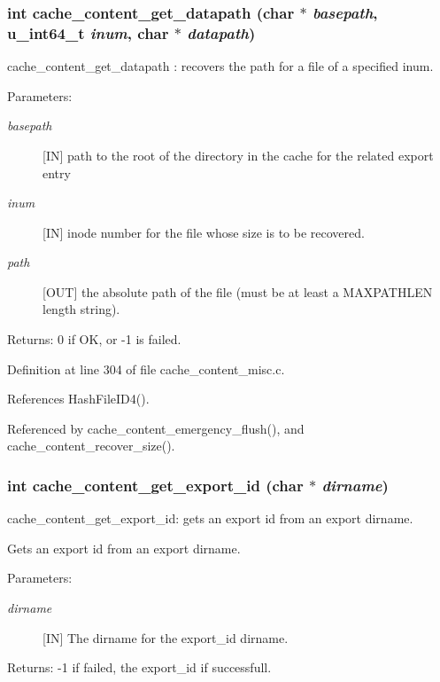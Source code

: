 \subsubsection{\setlength{\rightskip}{0pt plus 5cm}int cache\_\-content\_\-get\_\-datapath (char $\ast$ {\em basepath}, u\_\-int64\_\-t {\em inum}, char $\ast$ {\em datapath})}\label{cache__content__misc_8c_a7}


cache\_\-content\_\-get\_\-datapath : recovers the path for a file of a specified inum.

\begin{Desc}
\item[Parameters:]
\begin{description}
\item[{\em basepath}][IN] path to the root of the directory in the cache for the related export entry \item[{\em inum}][IN] inode number for the file whose size is to be recovered. \item[{\em path}][OUT] the absolute path of the file (must be at least a MAXPATHLEN length string).\end{description}
\end{Desc}
\begin{Desc}
\item[Returns:]0 if OK, or -1 is failed. \end{Desc}


Definition at line 304 of file cache\_\-content\_\-misc.c.

References Hash\-File\-ID4().

Referenced by cache\_\-content\_\-emergency\_\-flush(), and cache\_\-content\_\-recover\_\-size().
\subsubsection{\setlength{\rightskip}{0pt plus 5cm}int cache\_\-content\_\-get\_\-export\_\-id (char $\ast$ {\em dirname})}\label{cache__content__misc_8c_a5}


cache\_\-content\_\-get\_\-export\_\-id: gets an export id from an export dirname.

Gets an export id from an export dirname.

\begin{Desc}
\item[Parameters:]
\begin{description}
\item[{\em dirname}][IN] The dirname for the export\_\-id dirname.\end{description}
\end{Desc}
\begin{Desc}
\item[Returns:]-1 if failed, the export\_\-id if successfull. \end{Desc}


